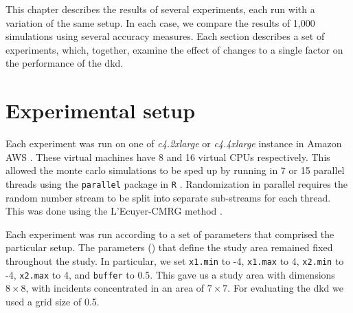 

This chapter describes the results of several experiments, each run with a variation of the same setup.
In each case, we compare the results of 1,000 simulations using several accuracy measures.
Each section describes a set of experiments, which, together, examine the effect of changes to a single factor on the performance of the \gls{dkd}.

\section{Experimental setup}
\label{sec:results:setup}

Each experiment was run on one of \textit{c4.2xlarge} or \textit{c4.4xlarge} instance in Amazon AWS \citep{aws:instancetypes}.
These virtual machines have 8 and 16 virtual CPUs respectively.
This allowed the monte carlo simulations to be sped up by running in 7 or 15 parallel threads using the \texttt{parallel} package in \texttt{R} \citep{r:parallel}.
Randomization in parallel requires the random number stream to be split into separate sub-streams for each thread. 
This was done using the L'Ecuyer-CMRG method \citep{lecuyer2002random}.

Each experiment was run according to a set of parameters that comprised the particular setup.
The parameters () that define the study area remained fixed throughout the study.
In particular, we set \texttt{x1.min} to -4, \texttt{x1.max} to 4, \texttt{x2.min} to -4, \texttt{x2.max} to 4, and \texttt{buffer} to 0.5.
This gave us a study area with dimensions $8 \times 8$, with incidents concentrated in an area of $7 \times 7$.
For evaluating the \gls{dkd} we used a grid size of 0.5.


